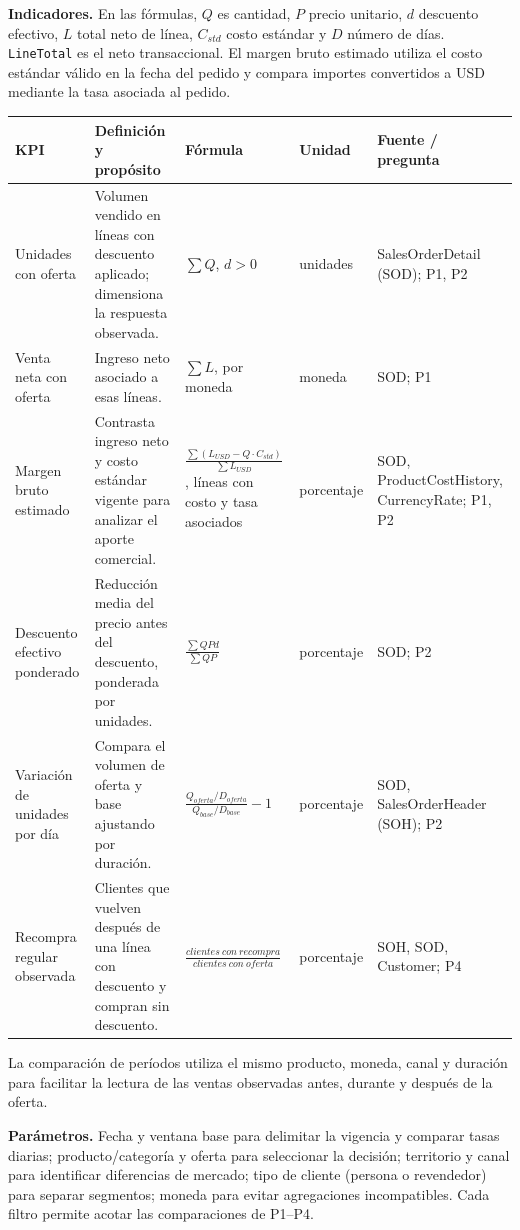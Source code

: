 \documentclass[10pt,a4paper]{article}
\begin{document}
\textbf{Indicadores.} En las fórmulas, \(Q\) es cantidad, \(P\) precio unitario,
\(d\) descuento efectivo, \(L\) total neto de línea, \(C_{std}\) costo estándar
y \(D\) número de días.
\texttt{LineTotal} es el neto transaccional. El margen bruto estimado utiliza
el costo estándar válido en la fecha del pedido y compara importes convertidos
a USD mediante la tasa asociada al pedido.

\small
\begin{longtable}{p{}p{}p{}p{}p{}}
\toprule
\textbf{KPI} & \textbf{Definición y propósito} & \textbf{Fórmula} &
\textbf{Unidad} & \textbf{Fuente / pregunta}\\
\midrule
\endhead
Unidades con oferta & Volumen vendido en líneas con descuento aplicado;
dimensiona la respuesta observada. & \(\sum Q\), \(d>0\) & unidades &
SalesOrderDetail (SOD); P1, P2\\
Venta neta con oferta & Ingreso neto asociado a esas líneas. & \(\sum L\),
por moneda & moneda & SOD; P1\\
Margen bruto estimado & Contrasta ingreso neto y costo estándar vigente para
analizar el aporte comercial. & \(\frac{\sum (L_{USD}-Q\cdot C_{std})}
{\sum L_{USD}}\), líneas con costo y tasa asociados & porcentaje &
SOD, ProductCostHistory, CurrencyRate; P1, P2\\
Descuento efectivo ponderado & Reducción media del precio antes del
descuento, ponderada por unidades. & \(\frac{\sum QPd}{\sum QP}\) &
porcentaje & SOD; P2\\
Variación de unidades por día & Compara el volumen de oferta y base ajustando
por duración. & \(\frac{Q_{oferta}/D_{oferta}}
{Q_{base}/D_{base}}-1\) & porcentaje & SOD, SalesOrderHeader (SOH); P2\\
Recompra regular observada & Clientes que vuelven después de una línea con
descuento y compran sin descuento. & \(\frac{clientes\ con\ recompra}
{clientes\ con\ oferta}\) & porcentaje & SOH, SOD, Customer; P4\\
\bottomrule
\end{longtable}
\normalsize

La comparación de períodos utiliza el mismo producto, moneda, canal y duración
para facilitar la lectura de las ventas observadas antes, durante y después
de la oferta.

\textbf{Parámetros.} Fecha y ventana base para delimitar la vigencia y comparar
tasas diarias; producto/categoría y oferta para seleccionar la decisión;
territorio y canal para identificar diferencias de mercado; tipo de cliente
(persona o revendedor) para separar segmentos; moneda para evitar agregaciones
incompatibles. Cada filtro permite acotar las comparaciones de P1--P4.
\end{document}
